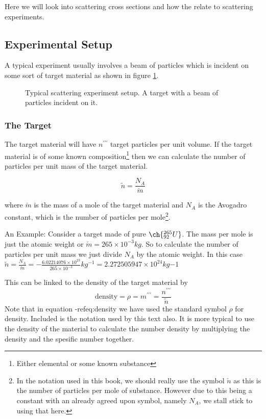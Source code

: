 Here we will look into scattering cross sections and how the relate to scattering experiments.

\subsection{Experimental Setup}
A typical experiment usually involves a beam of particles which is incident on some sort of target material as shown in figure \ref{fig:setup}.

\begin{figure}[h]
  \centering

\caption{Typical scattering experiment setup. A target with a beam of particles incident on it.} \label{fig:setup}
\end{figure}

\subsubsection{The Target}
The target material will have $n^{\prime\prime\prime}$ target particles per unit volume. If the target material is of some known composition\footnote{Either elemental or some known substance} then we can calculate the number of particles per unit mass of the target material.

\begin{equation}
  \label{eq:spesific number}
\tilde{n} = \frac{N_A}{\check{m}}
\end{equation}

where $\check{m}$ is the mass of a mole of the target material and $N_A$ is the Avogadro constant, which is the number of particles per mole\footnote{In the notation used in this book, we should really use the symbol $\check{n}$ as this is the number of particles per mole of substance. However due to this being a constant with an already agreed upon symbol, namely $N_A$, we stall stick to using that here.}.

\begin{framed}
  An Example: Consider a target made of pure $\ch{^{265}_{92}U}$. The mass per mole is just the atomic weight or $\check{m} = 265 \times 10^{-3}kg$. So to calculate the number of particles per unit mass we just divide $N_A$ by the atomic weight. In this case $\tilde{n}=\frac{N_A}{\check{m}}=-\frac{6.02214076\times10^{23}}{265 \times 10^{-3}}kg^{-1}=2.272505947\times10^{24}kg{-1}$
\end{framed}

This can be linked to the density of the target material by
\begin{equation}
  \label{eq:density}
\mathrm{density} =\rho= m^{\prime\prime\prime} = \frac{n^{\prime\prime\prime}}{\tilde{n}}
\end{equation}
Note that in equation -ref{eq:density} we have used the standard symbol $\rho$ for density. Included is the notation used by this text also. It is more typical to use the density of the material to calculate the number density by multiplying the density and the spesific number together.

